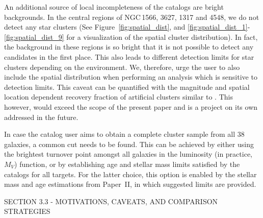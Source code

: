 An additional source of local incompleteness of the catalogs are bright backgrounds. In the central regions of NGC\,1566, 3627, 1317 and 4548, we do not detect any star clusters (See Figure~\ref{fig:spatial_dist}, and \ref{fig:spatial_dist_1}-\ref{fig:spatial_dist_9} for a visualization of the spatial cluster distribution). In fact, the background in these regions is so bright that it is not possible to detect any candidates in the first place. This also leads to different detection limits for star clusters depending on the environment. 
We, therefore, urge the user to also include the spatial distribution when performing an analysis which is sensitive to detection limits.
This caveat can be quantified with the magnitude and spatial location dependent recovery fraction of artificial clusters similar to \citet{adamo_legacy_2017}. This however, would exceed the scope of the present paper and is a project on its own addressed in the future. 

In case the catalog user aims to obtain a complete cluster sample from all 38 galaxies, a common cut needs to be found. This can be achieved by either using the brightest turnover point amongst all galaxies in the luminosity (in practice, $M_V$) function, or by establishing age and stellar mass limits satisfied by the catalogs for all targets. For the latter choice, this option is enabled by the stellar mass and age estimations from Paper~II, in which suggested limits are provided.



SECTION 3.3 - MOTIVATIONS, CAVEATS, AND COMPARISON STRATEGIES
 
